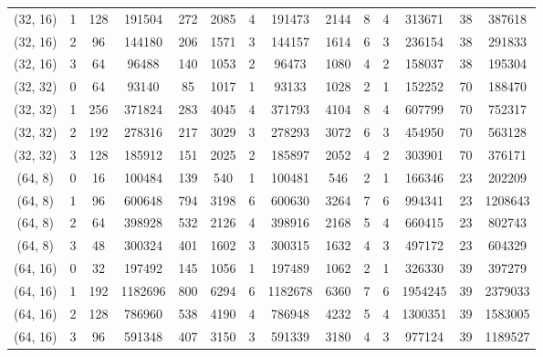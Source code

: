 \begin{tabular}{|c|c||c|c|c|c|c|c|c|c||c|c|c|c|}
 (32, 16) &          1 & 128 &  191504 & 272 &  2085 & 4 &  191473 &  2144 &  8 &                 4 &  313671 &     38 &      387618 \\
 (32, 16) &          2 &  96 &  144180 & 206 &  1571 & 3 &  144157 &  1614 &  6 &                 3 &  236154 &     38 &      291833 \\
 (32, 16) &          3 &  64 &   96488 & 140 &  1053 & 2 &   96473 &  1080 &  4 &                 2 &  158037 &     38 &      195304 \\
 (32, 32) &          0 &  64 &   93140 &  85 &  1017 & 1 &   93133 &  1028 &  2 &                 1 &  152252 &     70 &      188470 \\
 (32, 32) &          1 & 256 &  371824 & 283 &  4045 & 4 &  371793 &  4104 &  8 &                 4 &  607799 &     70 &      752317 \\
 (32, 32) &          2 & 192 &  278316 & 217 &  3029 & 3 &  278293 &  3072 &  6 &                 3 &  454950 &     70 &      563128 \\
 (32, 32) &          3 & 128 &  185912 & 151 &  2025 & 2 &  185897 &  2052 &  4 &                 2 &  303901 &     70 &      376171 \\
  (64, 8) &          0 &  16 &  100484 & 139 &   540 & 1 &  100481 &   546 &  2 &                 1 &  166346 &     23 &      202209 \\
  (64, 8) &          1 &  96 &  600648 & 794 &  3198 & 6 &  600630 &  3264 &  7 &                 6 &  994341 &     23 &     1208643 \\
  (64, 8) &          2 &  64 &  398928 & 532 &  2126 & 4 &  398916 &  2168 &  5 &                 4 &  660415 &     23 &      802743 \\
  (64, 8) &          3 &  48 &  300324 & 401 &  1602 & 3 &  300315 &  1632 &  4 &                 3 &  497172 &     23 &      604329 \\
 (64, 16) &          0 &  32 &  197492 & 145 &  1056 & 1 &  197489 &  1062 &  2 &                 1 &  326330 &     39 &      397279 \\
 (64, 16) &          1 & 192 & 1182696 & 800 &  6294 & 6 & 1182678 &  6360 &  7 &                 6 & 1954245 &     39 &     2379033 \\
 (64, 16) &          2 & 128 &  786960 & 538 &  4190 & 4 &  786948 &  4232 &  5 &                 4 & 1300351 &     39 &     1583005 \\
 (64, 16) &          3 &  96 &  591348 & 407 &  3150 & 3 &  591339 &  3180 &  4 &                 3 &  977124 &     39 &     1189527 \\

\end{tabular}
